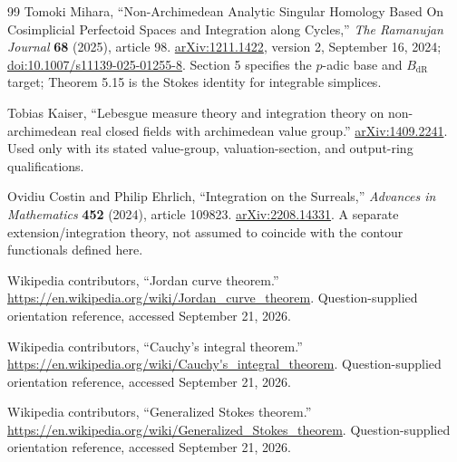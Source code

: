\documentclass[11pt,letterpaper]{article}
\theoremstyle{definition}
\theoremstyle{remark}
\newcommand{\dR}{\mathrm{dR}}\newcommand{\sh}{^{\sharp}}\newcommand{\abs}[1]{\left|#1\right|}
\numberwithin{equation}{section}
\begin{document}
\begin{thebibliography}{99}
Tomoki Mihara,
``Non-Archimedean Analytic Singular Homology Based On Cosimplicial Perfectoid Spaces and Integration along Cycles,''
\emph{The Ramanujan Journal} \textbf{68} (2025), article 98.
\href{https://arxiv.org/abs/1211.1422}{arXiv:1211.1422}, version 2, September 16, 2024;
\href{https://doi.org/10.1007/s11139-025-01255-8}{doi:10.1007/s11139-025-01255-8}.
Section 5 specifies the $p$-adic base and $B_{\dR}$ target; Theorem 5.15 is the Stokes identity for integrable simplices.

Tobias Kaiser,
``Lebesgue measure theory and integration theory on non-archimedean real closed fields with archimedean value group.''
\href{https://arxiv.org/abs/1409.2241}{arXiv:1409.2241}.
Used only with its stated value-group, valuation-section, and output-ring qualifications.

Ovidiu Costin and Philip Ehrlich,
``Integration on the Surreals,''
\emph{Advances in Mathematics} \textbf{452} (2024), article 109823.
\href{https://arxiv.org/abs/2208.14331}{arXiv:2208.14331}.
A separate extension/integration theory, not assumed to coincide with the contour functionals defined here.

Wikipedia contributors, ``Jordan curve theorem.''
\url{https://en.wikipedia.org/wiki/Jordan_curve_theorem}.
Question-supplied orientation reference, accessed September 21, 2026.

Wikipedia contributors, ``Cauchy's integral theorem.''
\url{https://en.wikipedia.org/wiki/Cauchy's_integral_theorem}.
Question-supplied orientation reference, accessed September 21, 2026.

Wikipedia contributors, ``Generalized Stokes theorem.''
\url{https://en.wikipedia.org/wiki/Generalized_Stokes_theorem}.
Question-supplied orientation reference, accessed September 21, 2026.
\end{thebibliography}
\end{document}

